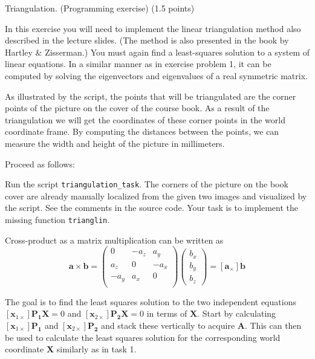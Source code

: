 \documentclass[12pt]{article} %
\newenvironment{exercise}[2][Task]{\begin{trivlist}
\item[\hskip \labelsep {\bfseries #1}\hskip \labelsep {\bfseries #2.}]}{\end{trivlist}}
\begin{document}
\vspace{2.5mm}

\begin{exercise}{3} Triangulation. (Programming exercise) (1.5 points)

\vspace{1mm}
\noindent In this exercise you will need to implement the linear triangulation method also described in the lecture slides.  (The method is also presented in the book by Hartley \& Zisserman.) You must again find a least-squares solution to a system of linear equations. In a similar manner as in exercise problem 1, it can be computed by solving the eigenvectors and eigenvalues of a real symmetric matrix.

As illustrated by the script, the points that will be triangulated are the corner points of the picture on the cover of the course book. As a result of the triangulation we will get the coordinates of these corner points in the world coordinate frame. By computing the distances between the points, we can measure the width and height of the picture in millimeters.

\vspace{1mm}
\noindent Proceed as follows:
\newline

\noindent Run the script \texttt{triangulation\_task}.
 The corners of the picture on the book cover are already manually localized from the given two images and visualized by the script. See the comments in the source code.
 Your task is to implement the missing function \texttt{trianglin}.
\newline
 
\noindent Cross-product as a matrix multiplication can be written as
\begin{equation*}
\mathbf{a} \times \mathbf{b} = 
\begin{pmatrix}0 & -a_z & a_y\\
a_z & 0 & -a_x\\
-a_y & a_x & 0\\
\end{pmatrix}
\begin{pmatrix}b_x \\ b_y \\ b_z \end{pmatrix}
=[\mathbf{a}_\times]\mathbf{b}
\end{equation*}

\noindent The goal is to find the least squares solution to the two independent equations $[\mathbf{x}_{1\times}]\mathbf{P_1}\mathbf{X}=0$ and $[\mathbf{x}_{2\times}]\mathbf{P_2\mathbf{X}}=0$ in terms of $\mathbf{X}$. Start by calculating $[\mathbf{x}_{1\times}]\mathbf{P_1}$ and $[\mathbf{x}_{2\times}]\mathbf{P_2}$ and stack these vertically to acquire $\mathbf{A}$. This can then be used to calculate the least squares solution for the corresponding world coordinate $\mathbf{X}$ similarly as in task 1.
\newline


\end{exercise}
\end{document}
